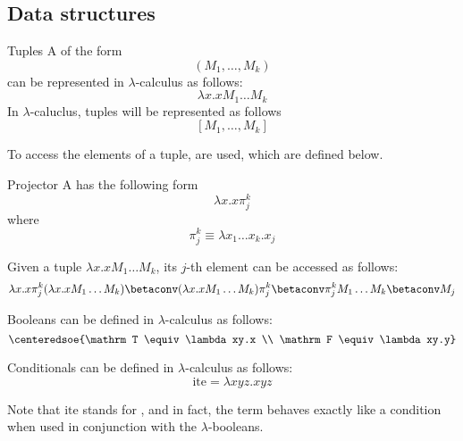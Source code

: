 \documentclass[a4paper, 12pt]{report}
\begin{document}
    \subsection{Data structures}

    \begin{frameddefn}{Tuples}
        A  of the form $$(M_1, \ldots, M_k)$$ can be represented in $\lambda$-calculus as follows: $$\lambda x.xM_1 \ldots M_k$$ In $\lambda$-caluclus, tuples will be represented as follows $$[M_1, \ldots, M_k]$$
    \end{frameddefn}

    To access the elements of a tuple,  are used, which are defined below.

    \begin{frameddefn}{Projector}
        A  has the following form $$\lambda x.x\pi_j^k$$ where $$\pi_j^k \equiv \lambda x_1 \ldots x_k.x_j$$
    \end{frameddefn}

    \begin{example}[Projectors]
        Given a tuple $\lambda x.x M_1 \ldots M_k$, its $j$-th element can be accessed as follows: $$\lambda x.x \pi_j^k (\lambda x.x M_1 \ldots M_k) \betaconv (\lambda x.x M_1 \ldots M_k) \pi_j^k \betaconv \pi_j^k M_1 \ldots M_k \betaconv M_j$$
    \end{example}

    \begin{frameddefn}{Booleans}
         can be defined in $\lambda$-calculus as follows: $$\centeredsoe{\mathrm T \equiv \lambda xy.x \\ \mathrm F \equiv \lambda xy.y}$$
    \end{frameddefn}

    \begin{frameddefn}{Conditionals}
         can be defined in $\lambda$-calculus as follows: $$\mathrm{ite} = \lambda xyz.xyz$$
    \end{frameddefn}

    Note that $\mathrm{ite}$ stands for , and in fact, the term behaves exactly like a condition when used in conjunction with the $\lambda$-booleans.
\end{document}

